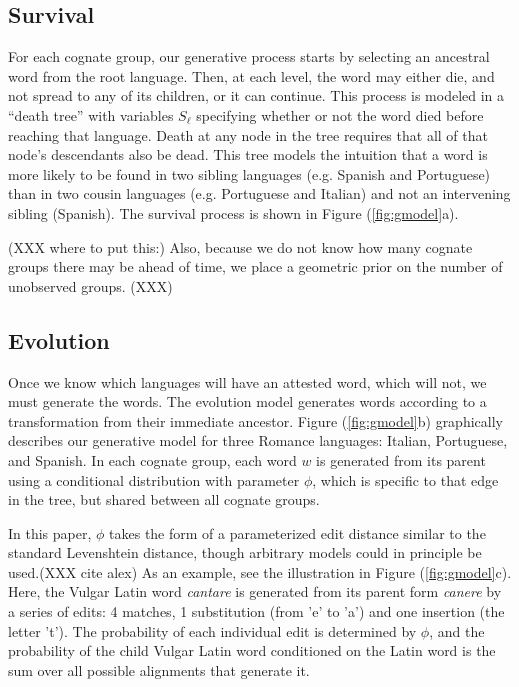 \documentclass[11pt,a4paper]{article}
\begin{document}
\subsection{Survival}

For each cognate group, our generative process starts by selecting
an ancestral word from the root language. Then, at each level, the
word may either die, and not spread to any of its children, or it
can continue. This process is modeled in a ``death tree'' with
variables $S_\ell$ specifying whether or not the word died before
reaching that language. Death at any node in the tree requires that
all of that node's descendants also be dead. This tree models the
intuition that a word is more likely to be found in two sibling
languages (e.g. Spanish and Portuguese) than in two cousin languages
(e.g. Portuguese and Italian) and not an intervening sibling
(Spanish). The survival process is shown in Figure (\ref{fig:gmodel}a).

(XXX where to put this:) Also, because we do not know how many cognate groups there may
be ahead of time, we place a geometric prior on the number of
unobserved groups. (XXX)

\subsection{Evolution}

Once we know which languages will have an attested word, which will
not, we must generate the words. The evolution model generates
words according to a transformation from their immediate ancestor.
Figure (\ref{fig:gmodel}b) graphically describes our generative
model for three Romance languages: Italian, Portuguese, and Spanish.
In each cognate group, each word $w$ is generated from its parent
using a conditional distribution with parameter $\phi$, which is
specific to that edge in the tree, but shared between all cognate
groups. 

In this paper, $\phi$ takes the form of a parameterized edit distance
similar to the standard Levenshtein distance, though arbitrary
models could in principle be used.(XXX cite alex) As an example,
see the illustration in Figure (\ref{fig:gmodel}c). Here, the Vulgar
Latin word \textit{cantare} is generated from its parent form
\textit{canere} by a series of edits: 4 matches, 1 substitution
(from 'e' to 'a') and one insertion (the letter 't'). The probability
of each individual edit is determined by $\phi$, and the probability
of the child Vulgar Latin word conditioned on the Latin word is the
sum over all possible alignments that generate it.
\end{document}

